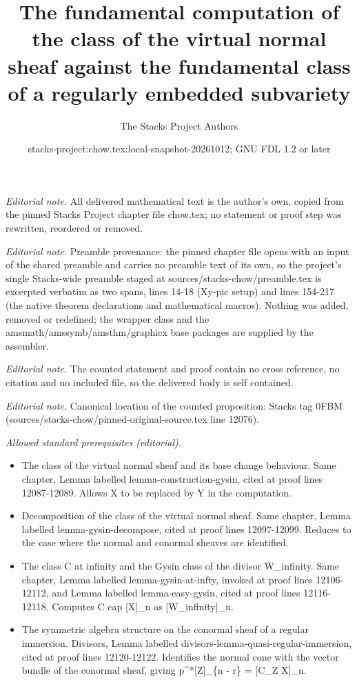 \documentclass[10pt,a4paper]{amsart}
\title{The fundamental computation of the class of the virtual normal sheaf against the fundamental class of a regularly embedded subvariety}
\author{The Stacks Project Authors}
\date{stacks-project:chow.tex:local-snapshot-20261012; GNU FDL 1.2 or later}
\theoremstyle{plain}
\theoremstyle{definition}
\theoremstyle{remark}
\numberwithin{equation}{subsection}
\begin{document}
\maketitle
\noindent\textit{Editorial note.} All delivered mathematical text is the author's own, copied from the pinned Stacks Project chapter file chow.tex; no statement or proof step was rewritten, reordered or removed.\par\medskip
\noindent\textit{Editorial note.} Preamble provenance: the pinned chapter file opens with an input of the shared preamble and carries no preamble text of its own, so the project's single Stacks-wide preamble staged at sources/stacks-chow/preamble.tex is excerpted verbatim as two spans, lines 14-18 (Xy-pic setup) and lines 154-217 (the native theorem declarations and mathematical macros). Nothing was added, removed or redefined; the wrapper class and the amsmath/amssymb/amsthm/graphicx base packages are supplied by the assembler.\par\medskip
\noindent\textit{Editorial note.} The counted statement and proof contain no cross reference, no citation and no included file, so the delivered body is self contained.\par\medskip
\noindent\textit{Editorial note.} Canonical location of the counted proposition: Stacks tag 0FBM (sources/stacks-chow/pinned-original-source.tex line 12076).\par\medskip
\noindent\textit{Allowed standard prerequisites (editorial).}\begin{itemize}
\item The class of the virtual normal sheaf and its base change behaviour. Same chapter, Lemma labelled lemma-construction-gysin, cited at proof lines 12087-12089. Allows X to be replaced by Y in the computation.
\item Decomposition of the class of the virtual normal sheaf. Same chapter, Lemma labelled lemma-gysin-decompose, cited at proof lines 12097-12099. Reduces to the case where the normal and conormal sheaves are identified.
\item The class C at infinity and the Gysin class of the divisor W\_infinity. Same chapter, Lemma labelled lemma-gysin-at-infty, invoked at proof lines 12106-12112, and Lemma labelled lemma-easy-gysin, cited at proof lines 12116-12118. Computes C cap [X]\_n as [W\_infinity]\_n.
\item The symmetric algebra structure on the conormal sheaf of a regular immersion. Divisors, Lemma labelled divisors-lemma-quasi-regular-immersion, cited at proof lines 12120-12122. Identifies the normal cone with the vector bundle of the conormal sheaf, giving p\textasciicircum{}*[Z]\_\{n - r\} = [C\_Z X]\_n.
\end{itemize}\medskip
\end{document}
